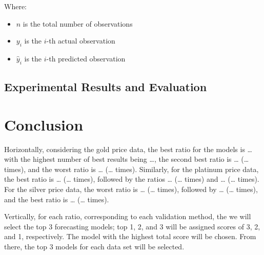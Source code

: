 \documentclass{ieeeojies}
\begin{document}
\indent Where:
\begin{itemize}
    \item $n$ is the total number of observations
    \item $y_i$ is the $i$-th actual observation
    \item $\hat{y}_i$ is the $i$-th predicted observation
\end{itemize}

\subsection{Experimental Results and Evaluation}

\section{Conclusion}

\indent Horizontally, considering the gold price data, the best ratio for the models is … with the highest number of best results being …, the second best ratio is … (… times), and the worst ratio is … (… times). Similarly, for the platinum price data, the best ratio is … (… times), followed by the ratios … (… times) and … (… times). For the silver price data, the worst ratio is … (… times), followed by … (… times), and the best ratio is … (… times).

\indent Vertically, for each ratio, corresponding to each validation method, the we will select the top 3 forecasting models; top 1, 2, and 3 will be assigned scores of 3, 2, and 1, respectively. The model with the highest total score will be chosen. From there, the top 3 models for each data set will be selected.
\end{document}

